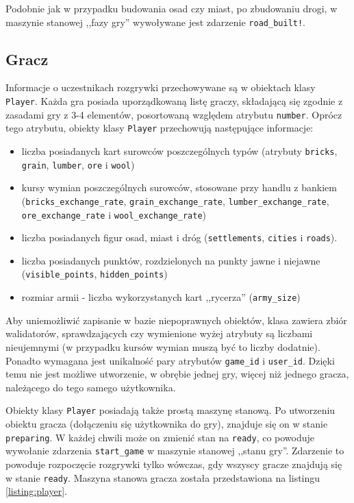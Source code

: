 \documentclass[11pt,twoside]{report}
\begin{document}
Podobnie jak w przypadku budowania osad czy miast, po zbudowaniu
drogi, w maszynie stanowej ,,fazy gry'' wywoływane jest zdarzenie
\texttt{road\_built!}.

\subsection{Gracz}
Informacje o uczestnikach rozgrywki przechowywane są w obiektach klasy
\texttt{Player}. Każda gra posiada uporządkowaną listę graczy,
składającą się zgodnie z zasadami gry z 3-4 elementów, posortowaną
względem atrybutu \texttt{number}. Oprócz tego atrybutu, obiekty klasy
\texttt{Player} przechowują następujące informacje:

\begin{itemize}
\item liczba posiadanych kart surowców poszczególnych typów (atrybuty
  \texttt{bricks}, \texttt{grain}, \texttt{lumber}, \texttt{ore} i
  \texttt{wool})
\item kursy wymian poszczególnych surowców, stosowane przy handlu z
  bankiem (\texttt{bricks\_exchange\_rate},
  \texttt{grain\_exchange\_rate}, \texttt{lumber\_exchange\_rate},
  \texttt{ore\_exchange\_rate} i \texttt{wool\_exchange\_rate})
\item liczba posiadanych figur osad, miast i dróg
  (\texttt{settlements}, \texttt{cities} i \texttt{roads}).
\item liczba posiadanych punktów, rozdzielonych na punkty jawne i
  niejawne (\texttt{visible\_points}, \texttt{hidden\_points})
\item rozmiar armii - liczba wykorzystanych kart ,,rycerza''
  (\texttt{army\_size})
\end{itemize}

Aby uniemożliwić zapisanie w bazie niepoprawnych obiektów, klasa
zawiera zbiór walidatorów, sprawdzających czy wymienione wyżej
atrybuty są liczbami nieujemnymi (w przypadku kursów wymian muszą być
to liczby dodatnie). Ponadto wymagana jest unikalność pary atrybutów
\texttt{game\_id} i \texttt{user\_id}. Dzięki temu nie jest możliwe
utworzenie, w obrębie jednej gry, więcej niż jednego gracza,
należącego do tego samego użytkownika.

Obiekty klasy \texttt{Player} posiadają także prostą maszynę
stanową. Po utworzeniu obiektu gracza (dołączeniu się użytkownika do
gry), znajduje się on w stanie \texttt{preparing}. W każdej chwili
może on zmienić stan na \texttt{ready}, co powoduje wywołanie
zdarzenia \texttt{start\_game} w maszynie stanowej ,,stanu
gry''. Zdarzenie to powoduje rozpoczęcie rozgrywki tylko wówczas, gdy
wszyscy gracze znajdują się w stanie \texttt{ready}. Maszyna stanowa
gracza została przedstawiona na listingu \ref{listing:player}.
\end{document}

